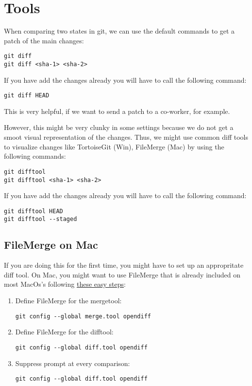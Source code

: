 \documentclass{report}
\begin{document}
\section{Tools}
When comparing two states in git, we can use the default commands to get a patch of the main changes:
\begin{verbatim}
git diff
git diff <sha-1> <sha-2>
\end{verbatim}
If you have add the changes already you will have to call the following command:
\begin{verbatim}
git diff HEAD
\end{verbatim}
This is very helpful, if we want to send a patch to a co-worker, for example.

However, this might be very clunky in some settings because we do not get a smoot visual representation of the changes. Thus, we might use common diff tools to visualize changes like TortoiseGit (Win), FileMerge (Mac) by using the following commands:
\begin{verbatim}
git difftool
git difftool <sha-1> <sha-2>
\end{verbatim}
If you have add the changes already you will have to call the following command:
\begin{verbatim}
git difftool HEAD
git difftool --staged
\end{verbatim}

\subsection{FileMerge on Mac}
If you are doing this for the first time, you might have to set up an appropritate diff tool.
On Mac, you might want to use FileMerge that is already included on most MacOs's following \href{https://stackoverflow.com/questions/21486481/is-it-possible-to-view-git-diffs-using-a-gui-side-by-side-tool-on-mac}{these easy steps}:
\begin{enumerate}[noitemsep]
    \item Define FileMerge for the mergetool:
    \begin{verbatim}
git config --global merge.tool opendiff
    \end{verbatim}
    \item Define FileMerge for the difftool:
    \begin{verbatim}
git config --global diff.tool opendiff	
    \end{verbatim}		
    \item Suppress prompt at every comparison:
    \begin{verbatim}
git config --global diff.tool opendiff
    \end{verbatim}	
\end{enumerate}
\end{document}
